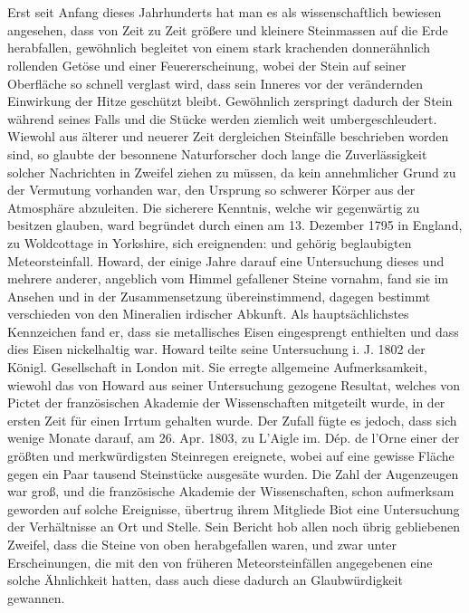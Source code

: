 \documentclass[a4paper, 11pt, oneside]{article}
\begin{document}
\section*{}
\paragraph{}
Erst seit Anfang dieses Jahrhunderts hat man es als wissenschaftlich bewiesen angesehen, dass von Zeit zu Zeit größere und kleinere Steinmassen auf die Erde herabfallen, gewöhnlich begleitet von einem stark krachenden donnerähnlich rollenden Getöse und einer Feuererscheinung, wobei der Stein auf seiner Oberfläche so schnell verglast wird, dass sein Inneres vor der verändernden Einwirkung der Hitze geschützt bleibt. Gewöhnlich zerspringt dadurch der Stein während seines Falls und die Stücke werden ziemlich weit umbergeschleudert. Wiewohl aus älterer und neuerer Zeit dergleichen Steinfälle beschrieben worden sind, so glaubte der besonnene Naturforscher doch lange die Zuverlässigkeit solcher Nachrichten in Zweifel ziehen zu müssen, da kein annehmlicher Grund zu der Vermutung vorhanden war, den Ursprung so schwerer Körper aus der Atmosphäre abzuleiten. Die sicherere Kenntnis, welche wir gegenwärtig zu besitzen glauben, ward begründet durch einen am 13. Dezember 1795 in England, zu Woldcottage in Yorkshire, sich ereignenden: und gehörig beglaubigten Meteorsteinfall. Howard, der einige Jahre darauf eine Untersuchung dieses und mehrere anderer, angeblich vom Himmel gefallener Steine vornahm, fand sie im Ansehen und in der Zusammensetzung übereinstimmend, dagegen bestimmt verschieden von den Mineralien irdischer Abkunft. Als hauptsächlichstes Kennzeichen fand er, dass sie metallisches Eisen eingesprengt enthielten und dass dies Eisen nickelhaltig war. Howard teilte seine Untersuchung i. J. 1802 der Königl. Gesellschaft in London mit. Sie erregte allgemeine Aufmerksamkeit, wiewohl das von Howard aus seiner Untersuchung gezogene Resultat, welches von Pictet der französischen Akademie der Wissenschaften mitgeteilt wurde, in der ersten Zeit für einen Irrtum gehalten wurde. Der Zufall fügte es jedoch, dass sich wenige Monate darauf, am 26. Apr. 1803, zu L'Aigle im. Dép. de l’Orne einer der größten und merkwürdigsten Steinregen ereignete, wobei auf eine gewisse Fläche gegen ein Paar tausend Steinstücke ausgesäte wurden. Die Zahl der Augenzeugen war groß, und die französische Akademie der Wissenschaften, schon aufmerksam geworden auf solche Ereignisse, übertrug ihrem Mitgliede Biot eine Untersuchung der Verhältnisse an Ort und Stelle. Sein Bericht hob allen noch übrig gebliebenen Zweifel, dass die Steine von oben herabgefallen waren, und zwar unter Erscheinungen, die mit den von früheren Meteorsteinfällen angegebenen eine solche Ähnlichkeit hatten, dass auch diese dadurch an Glaubwürdigkeit gewannen.
\end{document}
